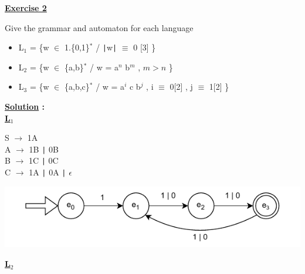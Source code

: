 \newpage

\begin{center}
    \Huge{\textbf{\underline{Exercise 2}}}
\end{center}

\vspace{0.5cm}
Give the grammar and automaton for each language
\begin{itemize}
    \item L\(_1\) = \{w \(\in\) 1.\{0,1\}\(^{*}\) / \texttt{|}w\texttt{|} \(\equiv\) 0 [3]  \}
    \item L\(_2\) = \{w \(\in\) \{a,b\}\(^{*}\) / w = a\(^{n}\) b\(^{m}\) , \(m > n \)  \}
    \item L\(_3\) = \{w \(\in\) \{a,b,c\}\(^{*}\) / w = a\(^{i}\) c b\(^{j}\) , i \(\equiv\) 0[2] , j \(\equiv\) 1[2]  \}
\end{itemize}

\vspace{1cm}

\textbf{\underline{\Large{Solution}} :}\\[0.4cm]
\textbf{\underline{L\(_1\)}}

    \vspace{0.3cm}

    \hspace{1.5cm}
\noindent
\begin{minipage}{0.4\textwidth}
    S \(\to\) 1A\\[0.1cm]
    A \(\to\) 1B \texttt{|} 0B\\[0.1cm]
    B \(\to\) 1C \texttt{|} 0C\\[0.1cm]
    C \(\to\) 1A \texttt{|} 0A \texttt{|} \(\epsilon\)
\end{minipage}%
\hspace{-1cm}
\begin{minipage}{0.5\textwidth}
    \centering
    \includegraphics[width=\textwidth]{Exercices/EX2/ex2.1.drawio.pdf}
\end{minipage}

\vspace{1.5cm}
\textbf{\underline{L\(_2\)}}

